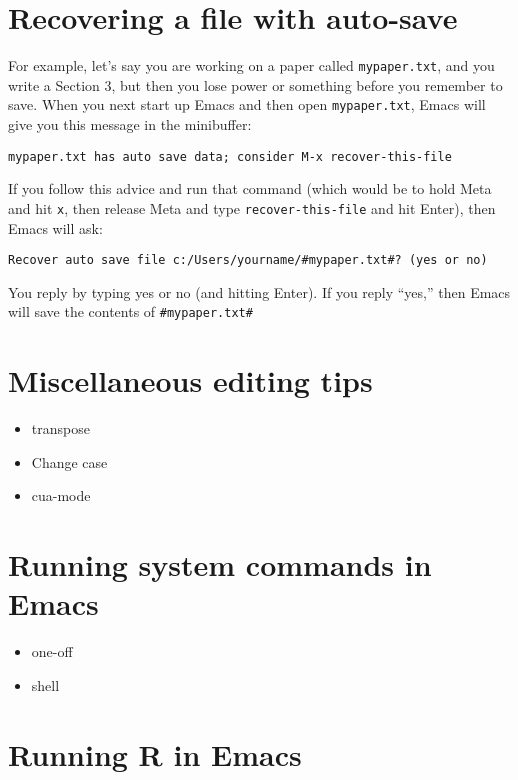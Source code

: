 \documentclass{article}
\begin{document}
\section{Recovering a file with auto-save}
\label{sec-11}

For example, let's say you are working on a paper called \texttt{mypaper.txt}, and you write a Section 3, but then you lose power or something before you remember to save.  When you next start up Emacs and then open \texttt{mypaper.txt}, Emacs will give you this message in the minibuffer: 


\begin{verbatim}
mypaper.txt has auto save data; consider M-x recover-this-file
\end{verbatim}

If you follow this advice and run that command (which would be to hold Meta and hit \texttt{x}, then release Meta and type \texttt{recover-this-file} and hit Enter), then Emacs will ask:


\begin{verbatim}
Recover auto save file c:/Users/yourname/#mypaper.txt#? (yes or no)
\end{verbatim}

You reply by typing yes or no (and hitting Enter).  If you reply ``yes,'' then Emacs will save the contents of \texttt{\#mypaper.txt\#}
\section{Miscellaneous editing tips}
\label{sec-12}

\begin{itemize}
\item transpose
\item Change case
\item cua-mode
\end{itemize}
\section{Running system commands in Emacs}
\label{sec-13}

\begin{itemize}
\item one-off
\item shell
\end{itemize}
\section{Running R in Emacs}
\label{sec-14}
\end{document}
